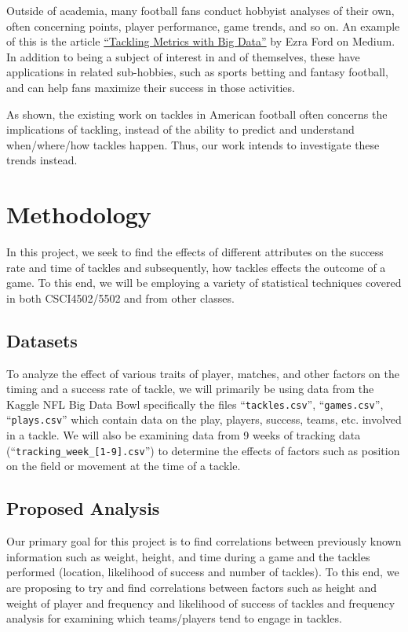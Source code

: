\documentclass[bibtex, sigconf, hyperref={colorlinks=true,linkcolor=blue,urlcolor=blue}]{acmart}
\begin{document}
Outside of academia, many football fans conduct hobbyist analyses of their own, often
concerning points, player performance, game trends, and so on. An example of this is
the article \href{https://medium.com/@ezra.ford/tackling-metrics-with-big-data-0812b5ab65f0}{“Tackling Metrics with Big Data”}
by Ezra Ford on Medium. In addition to being a subject of interest in and of themselves,
these have applications in related sub-hobbies, such as sports betting and fantasy football,
and can help fans maximize their success in those activities.

As shown, the existing work on tackles in American football often concerns the implications of
tackling, instead of the ability to predict and understand when/where/how tackles happen.
Thus, our work intends to investigate these trends instead.

\section{Methodology}

In this project, we seek to find the effects of different attributes on the
success rate and time of tackles and subsequently, how tackles effects the outcome
of a game.
To this end, we will be employing a variety of statistical techniques covered in
both CSCI4502/5502 and from other classes.

\subsection{Datasets}
To analyze the effect of various traits of player, matches, and other factors on
the timing and a success rate of tackle, we will primarily be using data from
the Kaggle NFL Big Data Bowl
\cite{nflkaggle}
specifically the files ``\verb|tackles.csv|'', ``\verb|games.csv|'',
``\verb|plays.csv|'' which contain data on the play, players, success, teams,
etc. involved in a tackle.
We will also be examining data from 9 weeks of tracking data (``\verb|tracking_week_[1-9].csv|'')
to determine the effects of factors such as position on the field or movement at the time of a tackle.

\subsection{Proposed Analysis}
Our primary goal for this project is to find correlations between previously
known information such as weight, height, and time during a game and the tackles
performed (location, likelihood of success and number of tackles). To this end,
we are proposing to try and find correlations between factors such as height and
weight of player and frequency and likelihood of success of tackles and
frequency analysis for examining which teams/players tend to engage in tackles.
\end{document}
